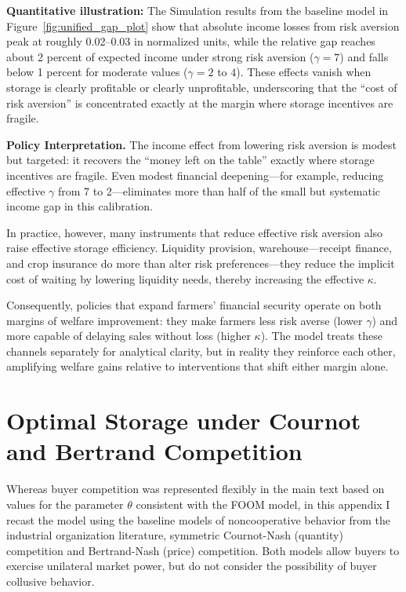\textbf{Quantitative illustration:} The Simulation results from the baseline model in Figure~\ref{fig:unified_gap_plot} show that absolute income losses from risk aversion peak at roughly 0.02--0.03 in normalized units, while the relative gap reaches about 2 percent of expected income under strong risk aversion ($\gamma=7$) and falls below 1 percent for moderate values ($\gamma=2$ to $4$). These effects vanish when storage is clearly profitable or clearly unprofitable, underscoring that the ``cost of risk aversion'' is concentrated exactly at the margin where storage incentives are fragile.


\textbf{Policy Interpretation.} 
The income effect from lowering risk aversion is modest but targeted: it recovers the ``money left on the table'' exactly where storage incentives are fragile. Even modest financial deepening---for example, reducing effective $\gamma$ from 7 to 2---eliminates more than half of the small but systematic income gap in this calibration. 

In practice, however, many instruments that reduce effective risk aversion also raise effective storage efficiency. Liquidity provision, warehouse---receipt finance, and crop insurance do more than alter risk preferences---they reduce the implicit cost of waiting by lowering liquidity needs, thereby increasing the effective $\kappa$.

Consequently, policies that expand farmers' financial security operate on both margins of welfare improvement: they make farmers less risk averse (lower $\gamma$) and more capable of delaying sales without loss (higher $\kappa$). The model treats these channels separately for analytical clarity, but in reality they reinforce each other, amplifying welfare gains relative to interventions that shift either margin alone.











\section{Optimal Storage under Cournot and Bertrand Competition}\label{Section: Special Cases: Explicit Competition Forms}
\noindent
Whereas buyer competition was represented flexibly in the main text based on values for the parameter $\theta$ consistent with the FOOM model, in this appendix I recast the model using the baseline models of noncooperative behavior from the industrial organization literature, symmetric Cournot-Nash (quantity) competition and Bertrand-Nash (price) competition. Both models allow buyers to exercise unilateral market power, but do not consider the possibility of buyer collusive behavior.

